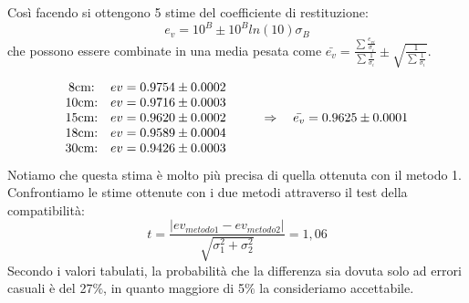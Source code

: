 \documentclass[a4paper]{article}
\theoremstyle{definition}
\begin{document}
	\begin{figure}[!ht]
		\captionsetup{labelformat=empty}

	\end{figure}
	\noindent Così facendo si ottengono 5 stime del coefficiente di restituzione:
	 \[e_{v}= 10^{B} \pm 10^{B}ln(10)\sigma_{B}\]
	 che possono essere combinate in una media pesata come \(\bar{e_{v}} = \frac{\sum\frac{e_{vi}}{\sigma_{i}}}{\sum\frac{1}{\sigma _{i}}} \pm \sqrt{\frac{1}{\sum \frac{1}{\sigma _{i}}}}\).
	
	\[\begin{matrix}
		$8cm:$ & $\(ev = 0.9754 \pm 0.0002\)$ &  \\ 
		$10cm:$ & $\(ev = 0.9716 \pm 0.0003\)$ &  \\ 
		$15cm:$ & $\(ev = 0.9620 \pm 0.0002\)$ & $\(\qquad \Rightarrow \quad \bar{e_{v}} = 0.9625 \pm 0.0001\)$\\ 
		$18cm:$ & $\(ev = 0.9589 \pm 0.0004\)$ &  \\ 
		$30cm:$ & $\(ev = 0.9426 \pm 0.0003\)$ & 
	\end{matrix}\]
	\noindent Notiamo che questa stima è molto più precisa di quella ottenuta con il metodo 1. Confrontiamo le stime ottenute con i due metodi attraverso il test della compatibilità:
	\[t = \frac{ \left |ev_{metodo1}  - ev_{metodo2} \right |}{\sqrt{\sigma_{1}^{2}+ \sigma_{2}^{2}}} = 1,06  \]
	\noindent Secondo i valori tabulati, la probabilità che la differenza sia dovuta solo ad errori casuali è del 27\(\%\), in quanto maggiore di 5\(\%\) la consideriamo accettabile.\\\\\\\\\\
\end{document}
